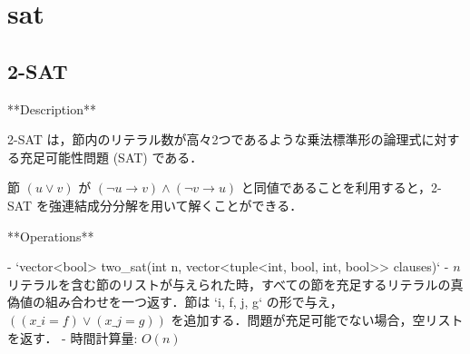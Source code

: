 \section{sat}

\subsection{2-SAT}

\begin{markdown}
**Description**

2-SAT は，節内のリテラル数が高々2つであるような乗法標準形の論理式に対する充足可能性問題 (SAT) である．

節 $(u \lor v)$ が $(\lnot u \rightarrow v) \land (\lnot v \rightarrow u)$ と同値であることを利用すると，2-SAT を強連結成分分解を用いて解くことができる．

**Operations**

- `vector<bool> two\_sat(int n, vector<tuple<int, bool, int, bool>> clauses)`
    - $n$ リテラルを含む節のリストが与えられた時，すべての節を充足するリテラルの真偽値の組み合わせを一つ返す．節は `{i, f, j, g}` の形で与え，$((x\_i = f) \lor (x\_j = g))$ を追加する．問題が充足可能でない場合，空リストを返す．
    - 時間計算量: $O(n)$
\end{markdown}

